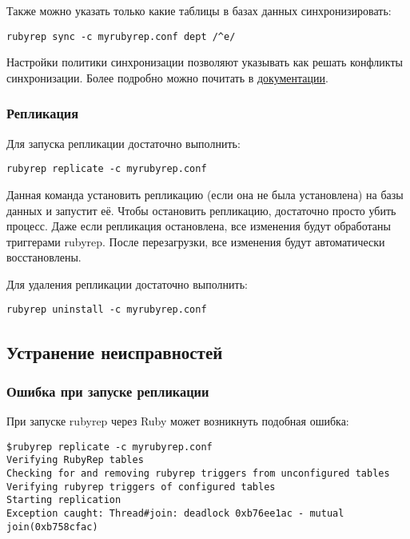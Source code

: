 Также можно указать только какие таблицы в базах данных синхронизировать:
\begin{lstlisting}[label=lst:rubyrep9,caption=Синхронизация баз данных]
rubyrep sync -c myrubyrep.conf dept /^e/
\end{lstlisting}

Настройки политики синхронизации позволяют указывать как решать конфликты синхронизации.
Более подробно можно почитать в \href{http://www.rubyrep.org/configuration.html}{документации}.

\subsubsection{Репликация}
Для запуска репликации достаточно выполнить:
\begin{lstlisting}[label=lst:rubyrep10,caption=Репликация]
rubyrep replicate -c myrubyrep.conf
\end{lstlisting}

Данная команда установить репликацию (если она не была установлена) на базы данных и запустит её.
Чтобы остановить репликацию, достаточно просто убить процесс. Даже если репликация остановлена,
все изменения будут обработаны триггерами rubyrep. После перезагрузки, все изменения
будут автоматически восстановлены.

Для удаления репликации достаточно выполнить:
\begin{lstlisting}[label=lst:rubyrep11,caption=Репликация]
rubyrep uninstall -c myrubyrep.conf
\end{lstlisting}

\subsection{Устранение неисправностей}
\subsubsection{Ошибка при запуске репликации}
При запуске rubyrep через Ruby может возникнуть подобная ошибка:
\begin{lstlisting}[label=lst:rubyrep12,caption=Устранение неисправностей]
$rubyrep replicate -c myrubyrep.conf
Verifying RubyRep tables
Checking for and removing rubyrep triggers from unconfigured tables
Verifying rubyrep triggers of configured tables
Starting replication
Exception caught: Thread#join: deadlock 0xb76ee1ac - mutual join(0xb758cfac)
\end{lstlisting}


